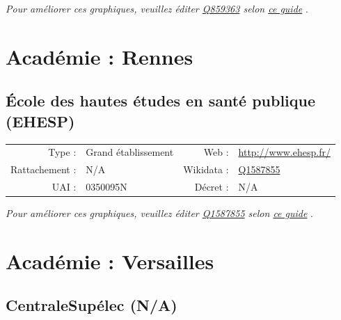 \documentclass[12pt,french,landscape]{article}
\begin{document}
\textit{\scriptsize Pour améliorer ces graphiques, veuillez éditer \href{https://www.wikidata.org/entity/Q859363}{Q859363}  selon \href{https://github.com/cpesr/wikidataESR/blob/master/Rmd/wikidataESR.md}{ce guide}}
.


\newpage

\hypertarget{acaduxe9mie-rennes-1}{%
\section{Académie : Rennes}\label{acaduxe9mie-rennes-1}}

\hypertarget{uxe9cole-des-hautes-uxe9tudes-en-santuxe9-publique-ehesp}{%
\subsection{École des hautes études en santé publique
(EHESP)}\label{uxe9cole-des-hautes-uxe9tudes-en-santuxe9-publique-ehesp}}

\begin{tabular*}{0.45\textwidth}{rp{2cm}rl}  
\hline  
Type : & Grand établissement & Web : &\href{http://www.ehesp.fr/}{http://www.ehesp.fr/} \\  
Rattachement : & N/A & Wikidata : & \href{https://www.wikidata.org/entity/Q1587855}{Q1587855} \\  
UAI : & 0350095N & Décret : & N/A \\  
\hline  
\end{tabular*}

\textit{\scriptsize Pour améliorer ces graphiques, veuillez éditer \href{https://www.wikidata.org/entity/Q1587855}{Q1587855}  selon \href{https://github.com/cpesr/wikidataESR/blob/master/Rmd/wikidataESR.md}{ce guide}}
.


\newpage

\hypertarget{acaduxe9mie-versailles-1}{%
\section{Académie : Versailles}\label{acaduxe9mie-versailles-1}}

\hypertarget{centralesupuxe9lec-na}{%
\subsection{CentraleSupélec (N/A)}\label{centralesupuxe9lec-na}}
\end{document}
